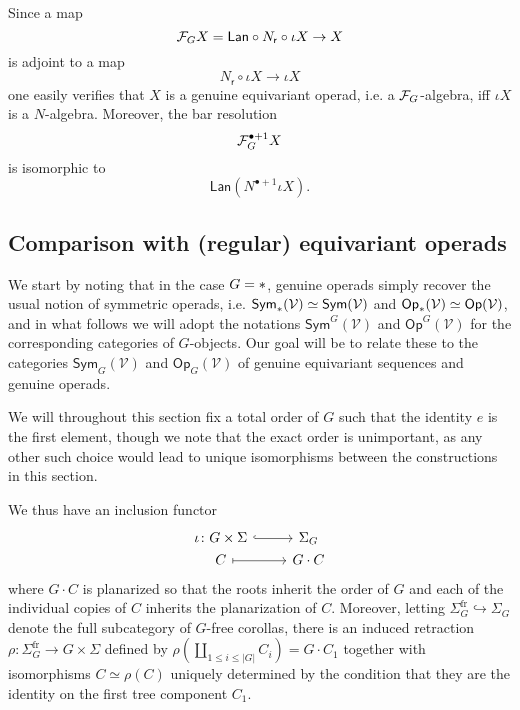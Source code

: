 \documentclass[a4paper,10pt]{article}%
\begin{document}
\begin{remark}\label{REPACKAGERES REM}
  Since a map 
  \[\mathcal F_G X =\mathsf{Lan} \circ N_{\mathsf{r}} \circ \iota X \to X\]
  is adjoint to a map
  \[N_{\mathsf{r}} \circ \iota X \to \iota X\]
  one easily verifies that 
  $X$ is a genuine equivariant operad, i.e. 
  a $\mathcal F_G$-algebra, iff 
  $\iota X$ is a $N$-algebra.
  Moreover, the bar resolution
  \[
  \mathcal F_G^{\bullet +1} X 
  \]
  is isomorphic to
  \[
  \mathsf{Lan} \left( N^{\bullet +1} \iota X \right).
  \]
\end{remark}


\subsection{Comparison with (regular) equivariant operads}

We start by noting that in the case $G = \**$, genuine operads simply recover the usual notion of symmetric operads, i.e. 
$\mathsf{Sym}_{\**}(\mathcal{V})
\simeq \mathsf{Sym}(\mathcal{V})$
and
$\mathsf{Op}_{\**}(\mathcal{V})
\simeq \mathsf{Op}(\mathcal{V})$, 
and in what follows we will adopt the notations
$\mathsf{Sym}^G(\mathcal{V})$ and
$\mathsf{Op}^G(\mathcal{V})$ 
for the corresponding categories of $G$-objects.
Our goal will be to relate these to the categories
$\mathsf{Sym}_G(\mathcal{V})$ and $\mathsf{Op}_G(\mathcal{V})$
of genuine equivariant sequences and genuine operads.

We will throughout this section fix a total order of $G$ such that the identity $e$ is the first element, though we note that the exact order is unimportant, as any other such choice would lead to unique isomorphisms between the constructions in this section.


We thus have an inclusion functor
\[
\begin{tikzcd}[row sep =0]
  \iota \colon G \times \Sigma \ar[hookrightarrow]{r} &
  \Sigma_G
  \\
  C \ar[mapsto]{r} & G \cdot C
\end{tikzcd}
\]
where $G \cdot C$ is planarized so that the roots inherit the order of $G$ and each of the individual copies of $C$ inherits the planarization of $C$.
Moreover, letting $\Sigma_G^{\text{fr}} \hookrightarrow \Sigma_G$ denote the full subcategory of $G$-free corollas, there is an induced retraction 
$\rho \colon \Sigma_{G}^{\text{fr}} \to G \times \Sigma$
defined by 
$\rho(\amalg_{1\leq i \leq |G|} C_i) = G \cdot C_1$
together with isomorphisms 
$C \simeq \rho(C)$
uniquely determined by the condition that they
are the identity on the first tree component $C_1$.
\end{document}
